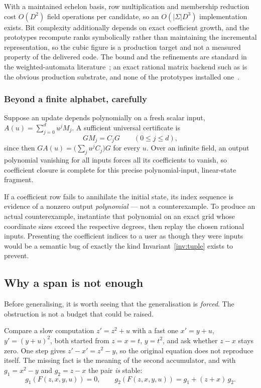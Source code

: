 With a maintained echelon basis, row multiplication and membership reduction
cost $O(D^2)$ field operations per candidate, so an $O(|\Sigma|D^3)$
implementation exists. Bit complexity additionally depends on exact coefficient
growth, and the prototypes recompute ranks symbolically rather than maintaining
the incremental representation, so the cubic figure is a production target and
not a measured property of the delivered code. The bound and the refinements
are standard in the weighted-automata literature~\cite{kiefer}; an exact
rational matrix backend such as  is the obvious production
substrate, and none of the prototypes installed one~\cite{flint-q}.

\subsubsection*{Beyond a finite alphabet, carefully}

Suppose an update depends polynomially on a fresh scalar input,
$A(u)=\sum_{j=0}^{d}u^jM_j$. A sufficient universal certificate is
\[
 GM_j=C_jG \qquad (0\le j\le d),
\]
since then $GA(u)=\bigl(\sum_j u^jC_j\bigr)G$ for every $u$. Over an infinite
field, an output polynomial vanishing for all inputs forces all its
coefficients to vanish, so coefficient closure is complete for this precise
polynomial-input, linear-state fragment.

\begin{remark}
If a coefficient row fails to annihilate the initial state, its index sequence
is evidence of a nonzero output \emph{polynomial} --- not a counterexample.
To produce an actual counterexample, instantiate that polynomial on an exact
grid whose coordinate sizes exceed the respective degrees, then replay the
chosen rational inputs. Presenting the coefficient indices to a user as though
they were inputs would be a semantic bug of exactly the kind
Invariant~\ref{inv:tuple} exists to prevent.
\end{remark}

\subsection{Why a span is not enough}
\label{sec:span-insufficient}

Before generalising, it is worth seeing that the generalisation is
\emph{forced}. The obstruction is not a budget that could be raised.

Compare a slow computation $z'=z^2+u$ with a fast one $x'=y+u$, $y'=(y+u)^2$,
both started from $z=x=t$, $y=t^2$, and ask whether $z-x$ stays zero. One step
gives $z'-x'=z^2-y$, so the original equation does not reproduce itself. The
missing fact is the meaning of the second accumulator, and with
$g_1=x^2-y$ and $g_2=z-x$ the pair \emph{is} stable:
\[
 g_1(F(z,x,y,u))=0,\qquad
 g_2(F(z,x,y,u))=g_1+(z+x)\,g_2 .
\]

